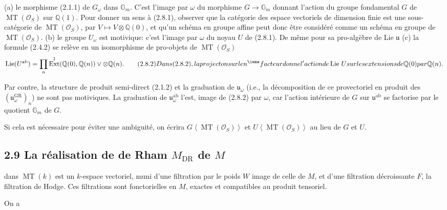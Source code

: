 \documentclass[11pt,a4paper]{article}
\theoremstyle{plain}
\theoremstyle{definition}
\theoremstyle{remark}
\DeclareMathOperator{\Ext}{Ext}
\DeclareMathOperator{\DR}{DR}
\DeclareMathOperator{\Lie}{Lie}
\DeclareMathOperator{\MT}{MT}
\DeclareMathOperator{\ab}{ab}
\newcommand{\GR}{\mathrm{GR}}
\newcommand{\dbG}{\mathbb{G}}
\newcommand{\dbQ}{\mathbb{Q}}
\newcommand{\scrO}{\mathscr{O}}
\newcommand{\gru}{\mathfrak{u}}
\newcommand{\upvee}{\vee}
\newcommand{\sans}{\textsf}
\providecommand{\Ext}{\operatorname{Ext}}
\providecommand{\DR}{\mathrm{DR}}
\providecommand{\Lie}{\operatorname{Lie}}
\providecommand{\ab}{\mathrm{ab}}
\begin{document}
\medskip\noindent
{\sans (a)}\enspace
le morphisme (2.1.1) de $G_\omega$ dans
$\dbG_m$.
C'est l'image par $\omega$ du morphisme
$G\to\dbG_m$
donnant l'action du groupe fondamental $G$ de
$\MT(\scrO_S)$ sur $\dbQ(1)$.
Pour donner un sens \`a (2.8.1), observer que
la cat\'egorie des espace vectoriels de
dimension finie est une sous-cat\'egorie de
$\MT(\scrO_S)$, par $V\mapsto V\otimes\dbQ(0)$,
et qu'un sch\'ema en groupe affine peut donc
\^{e}tre consid\'er\'e comme un sch\'ema en
groupe de $\MT(\scrO_S)$.
\medskip\noindent
{\sans (b)}\enspace
le groupe $U_\omega$ est motivique: c'est
l'image par $\omega$ du noyau $U$ de (2.8.1).
De m\^{e}me pour sa pro-alg\`ebre de Lie
$\gru$
\medskip\noindent
{\sans (c)}\enspace
la formule (2.4.2) se rel\`eve en
un isomorphisme de pro-objets de
$\MT(\scrO_S)$
\begin{equation}
\Lie(U^{\ab})=\prod\limits_{n}
\Ext^1(\dbQ(0),\dbQ(n))\upvee\otimes\dbQ(n).
\tag{2.8.2}
Dans (2.8.2), la projecton sur le n^{\ieme}
facteur donne l'action de \Lie\,U sur les
extensions de \dbQ(0) par \dbQ(n).
\end{equation}

Par contre, la structure de produit
semi-direct (2.1.2) et la graduation de
$\gru_\omega$ (i.e., la d\'ecomposition de ce
provectoriel en produit des
$\left(\gru_\omega^{\GR}\right)_n$)
ne sont pas motiviques.  
La graduation de $\gru_\omega^{\ab}$ l'est,
image de (2.8.2) par $\omega$, car
l'action int\'erieure de $G$ sur $\gru^{\ab}$
se factorise par le quotient $\dbG_m$ de $G$.

Si cela est n\'ecessaire pour \'eviter une
ambiguit\'e, on \'ecrira
$G\left<\MT(\scrO_S)\right>$ et
$U\left<\MT(\scrO_S)\right>$ au lieu de $G$
et $U$.

\subsection*{2.9 La r\'ealisation de de Rham $M_{\DR}$ de $M$}
dans $\MT(k)$ est un $k$-espace vectoriel, muni
d'une filtration par le poids $W$ image de
celle de $M$, et d'une filtration
d\'ecroissante $F$, la filtration de Hodge.
Ces filtrations sont fonctorielles en $M$,
exactes et compatibles au produit tensoriel.

On a
\end{document}

